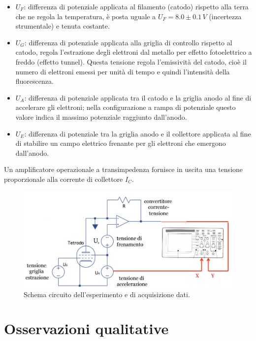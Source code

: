 \documentclass[10pt,a4paper]{article}
\begin{document}
\begin{itemize}
\item $U_F$: differenza di potenziale applicata al filamento (catodo) rispetto alla terra che ne regola la temperatura, è posta uguale a $U_F = 8.0\pm0.1 \,V$ (incertezza strumentale) e tenuta costante.
\item $U_G$: differenza di potenziale applicata alla griglia di controllo rispetto al catodo, regola l'estrazione degli elettroni dal metallo per effetto fotoelettrico a freddo (effetto tunnel). Questa tensione regola l'emissività del catodo, cioè il numero di elettroni emessi per unità di tempo e quindi l'intensità della fluorescenza.
\item $U_A$: differenza di potenziale applicata tra il catodo e la griglia anodo al fine di accelerare gli elettroni; nella configurazione a rampa di potenziale questo valore indica il massimo potenziale raggiunto dall'anodo.
\item $U_E$: differenza di potenziale tra la griglia anodo e il collettore applicata al fine di stabilire un campo elettrico frenante per gli elettroni che emergono dall'anodo.
\end{itemize}

Un amplificatore operazionale a transimpedenza fornisce in uscita una tensione proporzionale alla corrente di collettore $I_C$.\\

\begin{figure}[!htb]
  \centering
  \includegraphics[scale=.5]{circuito.png}
\caption{Schema circuito dell'esperimento e di acquisizione dati.}
\label{circuito}
\end{figure}


\section{Osservazioni qualitative}
\end{document}
